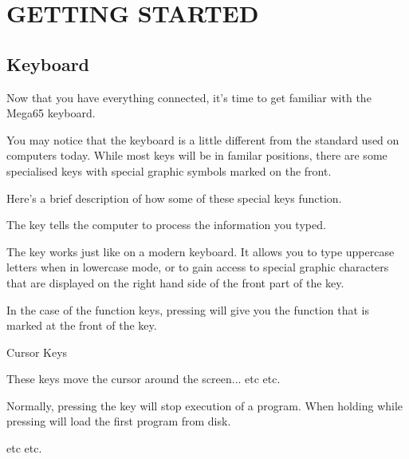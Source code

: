 \chapter{GETTING STARTED}
\section{Keyboard}

Now that you have everything connected, it's time to get familiar with the Mega65 keyboard.

You may notice that the keyboard is a little different from the standard used on computers today. While most keys will be in familar positions, there are some specialised keys with special graphic symbols marked on the front.

Here's a brief description of how some of these special keys function.

 \vspace*{1cm}


The  key tells the computer to process the information you typed.

 \vspace*{1cm}


The  key works just like on a modern keyboard. It allows you to type uppercase letters when in lowercase mode, or to gain access to special graphic characters that are displayed on the right hand side of the front part of the key.

In the case of the function keys, pressing  will give you the function that is marked at the front of the key.

 \vspace*{1cm}

\megakey{$\leftarrow$} \megakey{$\uparrow$} \megakey{$\rightarrow$} \megakey{$\downarrow$} Cursor Keys

These keys move the cursor around the screen... etc etc.

 \vspace*{1cm}


Normally, pressing the  key will stop execution of a program. When holding  while pressing  will load the first program from disk.

 \vspace*{1cm}


etc etc.
